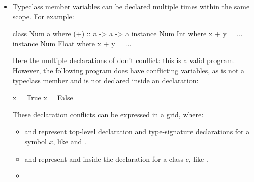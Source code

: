\documentclass[dissertation.tex]{subfiles}
\begin{document}
{{{            \begin{itemize}
            \item
            {

                Typeclass member variables can be declared multiple times within the same scope. For example:
                
                \begin{haskellfigure}
                class Num a where
                    (+) :: a -> a -> a
                instance Num Int where
                    x + y = ...
                instance Num Float where
                    x + y = ...
                \end{haskellfigure}

                Here the multiple declarations of \haskell{+} don't conflict: this is a valid program. However, the
                following program does have conflicting variables, as  is not a typeclass member and is not
                declared inside an  declaration:

                \begin{haskellfigure}
                x = True
                x = False
                \end{haskellfigure}

                These declaration conflicts can be expressed in a grid, where:

                \begin{itemize}
                \item
                {
                    
                     and  represent top-level declaration and
                    type-signature declarations for a symbol \(x\), like  and .

                }
                \item
                {
                    
                     and  represent
                     and  inside the declaration for a class \(c\),
                    like .

                }
                \item
                {

}
\end{itemize}}
\end{itemize}}}}
\end{document}
